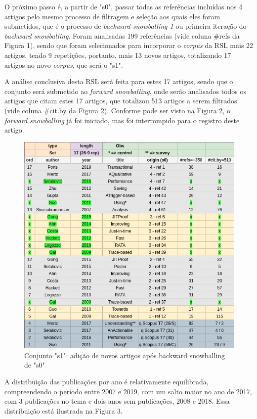 \documentclass[sigconf]{acmart}
\begin{document}
O próximo passo é, a partir de "s0", passar todas as referências incluídas nos 4 artigos pelo mesmo processo de filtragem e seleção aos quais eles foram submetidos, que é o processo de \textit{backward snowballing 1} ou primeira iteração do \textit{backward snowballing}. Foram analisadas 199 referências (vide coluna \#refs da Figura 1), sendo que foram selecionados para incorporar o \textit{corpus} da RSL mais 22 artigos, tendo 9 repetições, portanto, mais 13 novos artigos, totalizando 17 artigos no novo \textit{corpus}, que será o "s1".

A análise conclusiva desta RSL será feita para estes 17 artigos, sendo que o conjunto será submetido ao \textit{forward snowballing}, onde serão analisados todos os artigos que citam estes 17 artigos, que totalizou 513 artigos a serem filtrados (vide coluna \#cit.by da Figura 2). Conforme pode ser visto na Figura 2, o \textit{forward snowballing} já foi iniciado, mas foi interrompido para o registro deste artigo.

\begin{figure}[H]
  \centering
  \includegraphics[width=\linewidth]{s1}
  \caption{Conjunto "s1": adição de novos artigos após backward snowballing de "s0"}
\end{figure}

A distribuição das publicações por ano é relativamente equilibrada, compreendendo o período entre 2007 e 2019, com um salto maior no ano de 2017, com 3 publicações no tema e dois anos sem publicações, 2008 e 2018. Essa distribuição está ilustrada na Figura 3.
\end{document}
